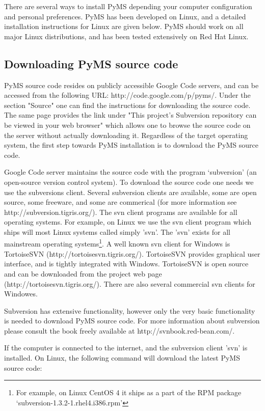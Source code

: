 There are several ways to install PyMS depending your computer
configuration and personal preferences. PyMS has been developed
on Linux, and a detailed installation instructions for Linux are
given below. PyMS should work on all major Linux distributions,
and has been tested extensively on Red Hat Linux.

\subsection{\label{subsec:code-download}Downloading PyMS source code}

PyMS source code resides on publicly accessible Google Code servers,
and can be accessed from the following URL: http://code.google.com/p/pyms/.
Under the section "Source" one can find the instructions for downloading
the source code. The same page provides the link under "This project's
Subversion repository can be viewed in your web browser" which allows
one to browse the source code on the server without actually downloading
it. Regardless of the target operating system, the first step towards
PyMS installation is to download the PyMS source code.

Google Code server maintains the source code with the program `subversion'
(an open-source version control system). To download the source code
one needs we use the subversions client. Several subversion clients are
available, some are open source, some freeware, and some are commerical
(for more information see http://subversion.tigris.org/). The svn client
programs are available for all operating systems. For example, on Linux
we use the svn client program which ships will most Linux systems called
simply 'svn'. The 'svn' exists for all mainstream operating
systems\footnote{For example, on Linux CentOS 4 it ships as a part of
the RPM package `subversion-1.3.2-1.rhel4.i386.rpm'}. A well known 
svn client for Windows is TortoiseSVN (http://tortoisesvn.tigris.org/).
TortoiseSVN provides graphical user interface, and is tightly integrated
with Windows. TortoiseSVN is open source and can be downloaded from the
project web page (http://tortoisesvn.tigris.org/). There are also several
commercial svn clients for Windowes.

Subversion has extensive functionality, however only the very basic
functionality is needed to download PyMS source code. For more information
about subversion please consult the book freely available
at http://svnbook.red-bean.com/.

If the computer is connected to the internet, and the subversion client
'svn' is installed. On Linux, the following command will download the
latest PyMS source code:

